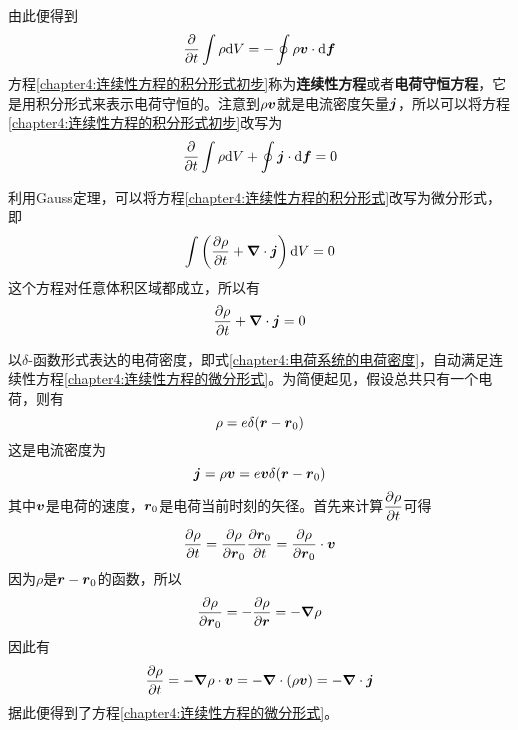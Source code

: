 由此便得到
\begin{equation}
	\frac{\partial}{\partial t}\int \rho \mathrm{d} V = -\oint \rho\boldsymbol{v}\cdot \mathrm{d}\boldsymbol{f}
	\label{chapter4:连续性方程的积分形式初步}
\end{equation}
方程\eqref{chapter4:连续性方程的积分形式初步}称为{\bf 连续性方程}或者{\bf 电荷守恒方程}，它是用积分形式来表示电荷守恒的。注意到$\rho \boldsymbol{v}$就是电流密度矢量$\boldsymbol{j}$，所以可以将方程\eqref{chapter4:连续性方程的积分形式初步}改写为
\begin{equation}
	\frac{\partial}{\partial t}\int \rho \mathrm{d} V + \oint \boldsymbol{j}\cdot \mathrm{d}\boldsymbol{f} = 0
	\label{chapter4:连续性方程的积分形式}
\end{equation}

利用Gauss定理，可以将方程\eqref{chapter4:连续性方程的积分形式}改写为微分形式，即
\begin{equation*}
	\int \left(\frac{\partial \rho}{\partial t}+\boldsymbol{\nabla} \cdot \boldsymbol{j}\right) \mathrm{d} V = 0
\end{equation*}
这个方程对任意体积区域都成立，所以有
\begin{equation}
	\frac{\partial \rho}{\partial t}+\boldsymbol{\nabla} \cdot \boldsymbol{j} = 0
	\label{chapter4:连续性方程的微分形式}
\end{equation}

以$\delta$-函数形式表达的电荷密度，即式\eqref{chapter4:电荷系统的电荷密度}，自动满足连续性方程\eqref{chapter4:连续性方程的微分形式}。为简便起见，假设总共只有一个电荷，则有
\begin{equation*}
	\rho = e\delta(\boldsymbol{r}-\boldsymbol{r}_0)
\end{equation*}
这是电流密度为
\begin{equation*}
	\boldsymbol{j} = \rho\boldsymbol{v} = e\boldsymbol{v}\delta(\boldsymbol{r}-\boldsymbol{r}_0)
\end{equation*}
其中$\boldsymbol{v}$是电荷的速度，$\boldsymbol{r}_0$是电荷当前时刻的矢径。首先来计算$\dfrac{\partial \rho}{\partial t}$可得
\begin{equation*}
	\frac{\partial \rho}{\partial t} = \frac{\partial \rho}{\partial \boldsymbol{r}_0} \frac{\partial \boldsymbol{r}_0}{\partial t} = \frac{\partial \rho}{\partial \boldsymbol{r}_0} \cdot \boldsymbol{v}
\end{equation*}
因为$\rho$是$\boldsymbol{r}-\boldsymbol{r}_0$的函数，所以
\begin{equation*}
	\frac{\partial \rho}{\partial \boldsymbol{r}_0} = -\frac{\partial \rho}{\partial \boldsymbol{r}} = -\boldsymbol{\nabla} \rho
\end{equation*}
因此有
\begin{equation*}
	\frac{\partial \rho}{\partial t} = -\boldsymbol{\nabla} \rho\cdot \boldsymbol{v} = -\boldsymbol{\nabla} \cdot (\rho \boldsymbol{v}) = -\boldsymbol{\nabla} \cdot \boldsymbol{j}
\end{equation*}
据此便得到了方程\eqref{chapter4:连续性方程的微分形式}。

